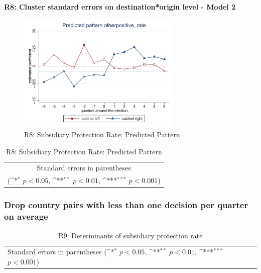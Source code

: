 \documentclass[10pt,a4paper]{scrartcl}
\begin{document}
\clearpage
\textbf{R8: Cluster standard errors on destination*origin level - Model 2}
\begin{figure}[!ht]
	\centering
	\includegraphics[width=0.7\textwidth]{figures_edited/otherpositive_rate_graph2_R8.pdf}
	\caption{R8: Subsidiary Protection Rate: Predicted Pattern}
\end{figure}

\begin{table}[!ht]\centering
	\footnotesize
	\renewcommand{\arraystretch}{1.2}
	\def\sym#1{\ifmmode^{#1}\else\(^{#1}\)\fi}
	\caption{R8: Subsidiary Protection Rate: Predicted Pattern}
	\begin{tabular}{l*{2}{c}}
		\hline\hline
		
		\hline\hline
		\multicolumn{3}{c}{\footnotesize Standard errors in parentheses} \\
		\multicolumn{3}{c}{\footnotesize (\sym{*} \(p<0.05\), \sym{**} \(p<0.01\), \sym{***} \(p<0.001\))} \\
	\end{tabular}
\end{table}





\clearpage
\FloatBarrier
\subsubsection{Drop country pairs with less than one decision per quarter on average}
\begin{table}[!ht]\centering
	\renewcommand{\arraystretch}{1.25}
	\small
	\def\sym#1{\ifmmode^{#1}\else\(^{#1}\)\fi}
	\caption{R9: Determinants of subsidiary protection rate}
	\begin{tabular}{l*{3}{c}}
		\hline\hline
		
		\hline\hline
		\multicolumn{4}{l}{\footnotesize Standard errors in parentheses (\sym{*} \(p<0.05\), \sym{**} \(p<0.01\), \sym{***} \(p<0.001\))}\\
	\end{tabular}
\end{table}
\end{document}
